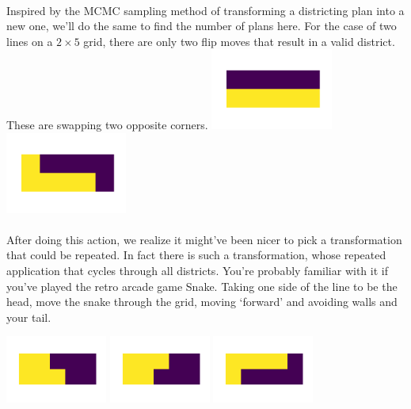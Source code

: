 \documentclass[12pt]{article}
\numberwithin{equation}{section}
\begin{document}
\begin{enumerate}
        \paragraph{} Inspired by the MCMC sampling method of transforming a districting plan into a new one, we'll do the same to find the number of plans here. For the case of two lines on a $2\times5$ grid, there are only two flip moves that result in a valid district. These are swapping two opposite corners.
        \includegraphics[width=0.3\textwidth]{figures/plan_0.png}
        \includegraphics[width=0.3\textwidth]{figures/plan_1.png}
        \paragraph{} After doing this action, we realize it might've been nicer to pick a transformation that could be repeated. In fact there is such a transformation, whose repeated application that cycles through all districts. You're probably familiar with it if you've played the retro arcade game Snake. Taking one side of the line to be the head, move the snake through the grid, moving `forward' and avoiding walls and your tail.

        \includegraphics[width=0.25\textwidth]{figures/plan_2.png}
        \includegraphics[width=0.25\textwidth]{figures/plan_3.png}
        \includegraphics[width=0.25\textwidth]{figures/plan_4.png}

\end{enumerate}
\end{document}
